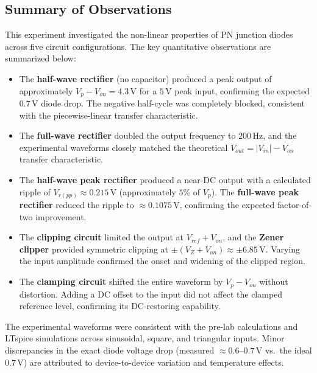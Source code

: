 \documentclass[12pt, letterpaper]{article}
\begin{document}
\subsection*{Summary of Observations}
This experiment investigated the non-linear properties of PN junction diodes across five circuit configurations. The key quantitative observations are summarized below:
\begin{itemize}
	\item The \textbf{half-wave rectifier} (no capacitor) produced a peak output of approximately $V_p - V_{on} = 4.3\,\text{V}$ for a $5\,\text{V}$ peak input, confirming the expected $0.7\,\text{V}$ diode drop. The negative half-cycle was completely blocked, consistent with the piecewise-linear transfer characteristic.
	\item The \textbf{full-wave rectifier} doubled the output frequency to $200\,\text{Hz}$, and the experimental waveforms closely matched the theoretical $V_{out} = |V_{in}| - V_{on}$ transfer characteristic.
	\item The \textbf{half-wave peak rectifier} produced a near-DC output with a calculated ripple of $V_{r(pp)} \approx 0.215\,\text{V}$ (approximately $5\%$ of $V_p$). The \textbf{full-wave peak rectifier} reduced the ripple to $\approx 0.1075\,\text{V}$, confirming the expected factor-of-two improvement.
	\item The \textbf{clipping circuit} limited the output at $V_{ref} + V_{on}$, and the \textbf{Zener clipper} provided symmetric clipping at $\pm(V_Z + V_{on}) \approx \pm 6.85\,\text{V}$. Varying the input amplitude confirmed the onset and widening of the clipped region.
	\item The \textbf{clamping circuit} shifted the entire waveform by $V_p - V_{on}$ without distortion. Adding a DC offset to the input did not affect the clamped reference level, confirming its DC-restoring capability.
\end{itemize}
The experimental waveforms were consistent with the pre-lab calculations and LTspice simulations across sinusoidal, square, and triangular inputs. Minor discrepancies in the exact diode voltage drop (measured $\approx 0.6$--$0.7\,\text{V}$ vs.\ the ideal $0.7\,\text{V}$) are attributed to device-to-device variation and temperature effects.
\end{document}
